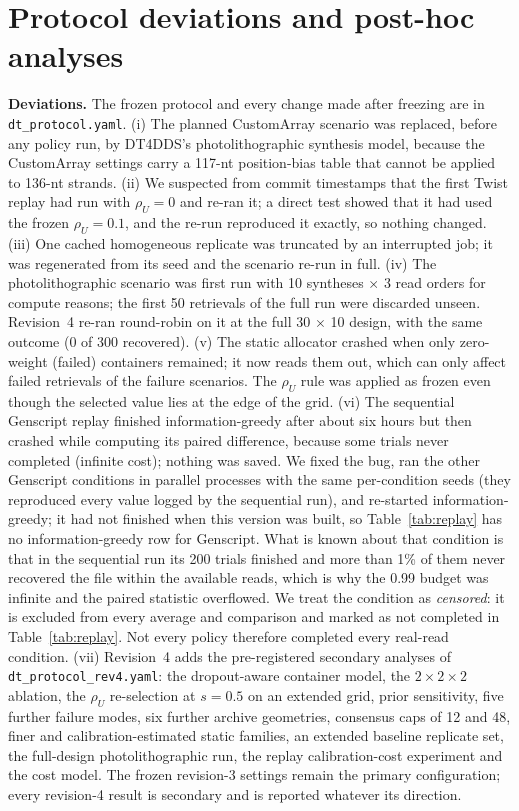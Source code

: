 \documentclass[conference,onecolumn,11pt]{IEEEtran}
\begin{document}
\section{Protocol deviations and post-hoc analyses}\label{app:dev}
\textbf{Deviations.}  The frozen protocol and every change made after freezing are in
\texttt{dt\_protocol.yaml}.  (i) The planned CustomArray scenario was replaced, before any policy
run, by DT4DDS's photolithographic synthesis model, because the CustomArray settings carry a
117-nt position-bias table that cannot be applied to 136-nt strands.  (ii) We suspected from commit timestamps that the first Twist replay had run with $\rho_U{=}0$ and
re-ran it; a direct test showed that it had used the frozen $\rho_U{=}0.1$, and the re-run reproduced it
exactly, so nothing changed.  (iii) One cached homogeneous
replicate was truncated by an interrupted job; it was regenerated from its seed and the scenario
re-run in full.  (iv) The photolithographic scenario was first run with 10 syntheses $\times$ 3 read
orders for compute reasons; the first 50 retrievals of the full run were discarded unseen.  Revision~4
re-ran round-robin on it at the full 30 $\times$ 10 design, with the same outcome (0 of 300 recovered).
(v) The static allocator crashed when only zero-weight (failed) containers remained; it now reads
them out, which can only affect failed retrievals of the failure scenarios.  The $\rho_U$ rule was
applied as frozen even though the selected value lies at the edge of the grid.  (vi) The
sequential Genscript replay finished information-greedy after about six hours but then crashed while
computing its paired difference, because some trials never completed (infinite cost); nothing was
saved.  We fixed the bug, ran the other Genscript conditions in parallel processes with the same
per-condition seeds (they reproduced every value logged by the sequential run), and re-started
information-greedy; it had not finished when this version was built, so Table~\ref{tab:replay} has no
information-greedy row for Genscript.  What is known about that condition is that in the sequential run
its 200 trials finished and more than 1\% of them never recovered the file within the available reads,
which is why the 0.99 budget was infinite and the paired statistic overflowed.  We treat the condition as
\emph{censored}: it is excluded from every average and comparison and marked as not completed in
Table~\ref{tab:replay}.  Not every policy therefore completed every real-read condition.  (vii) Revision~4 adds the pre-registered secondary analyses of
\texttt{dt\_protocol\_rev4.yaml}: the dropout-aware container model, the $2\times2\times2$ ablation,
the $\rho_U$ re-selection at $s{=}0.5$ on an extended grid, prior sensitivity, five further failure
modes, six further archive geometries, consensus caps of 12 and 48, finer and calibration-estimated
static families, an extended baseline replicate set, the full-design photolithographic run, the replay
calibration-cost experiment and the cost model.  The frozen revision-3 settings remain the primary
configuration; every revision-4 result is secondary and is reported whatever its direction.
\end{document}
